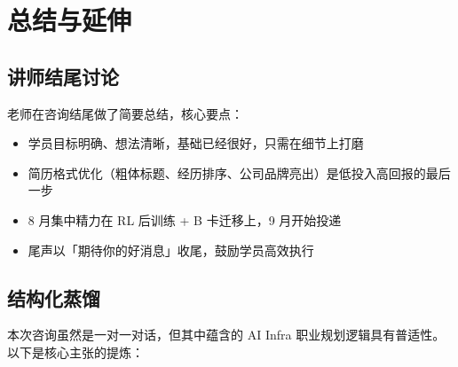 \documentclass[a4paper]{article}
\begin{document}
\section{总结与延伸}

\subsection{讲师结尾讨论}

老师在咨询结尾做了简要总结，核心要点：

\begin{itemize}
\item 学员目标明确、想法清晰，基础已经很好，只需在细节上打磨
\item 简历格式优化（粗体标题、经历排序、公司品牌亮出）是低投入高回报的最后一步
\item 8 月集中精力在 RL 后训练 + B 卡迁移上，9 月开始投递
\item 尾声以「期待你的好消息」收尾，鼓励学员高效执行
\end{itemize}

\subsection{结构化蒸馏}

本次咨询虽然是一对一对话，但其中蕴含的 AI Infra 职业规划逻辑具有普适性。以下是核心主张的提炼：
\end{document}
